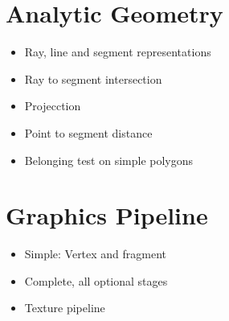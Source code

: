 \section{Analytic Geometry}
\begin{itemize}
  \item Ray, line and segment representations
  \item Ray to segment intersection
  \item Projecction
  \item Point to segment distance
  \item Belonging test on simple polygons
\end{itemize}

\section{Graphics Pipeline}
\begin{itemize}
  \item Simple: Vertex and fragment
  \item Complete, all optional stages
  \item Texture pipeline
\end{itemize}
